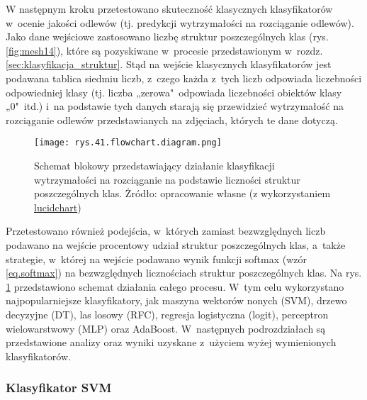 W następnym kroku przetestowano skuteczność klasycznych klasyfikatorów w~ocenie jakości odlewów (tj. predykcji wytrzymałości na rozciąganie odlewów). Jako dane wejściowe zastosowano liczbę struktur poszczególnych klas (rys. \ref{fig:mesh14}), które są pozyskiwane w~procesie przedstawionym w~rozdz. \ref{sec:klasyfikacja_struktur}. Stąd na wejście klasycznych klasyfikatorów jest podawana tablica siedmiu liczb, z~czego każda z~tych liczb odpowiada liczebności odpowiedniej klasy (tj. liczba „zerowa"~odpowiada liczebności obiektów klasy „0"~itd.) i~na podstawie tych danych starają się przewidzieć wytrzymałość na rozciąganie odlewów przedstawianych na zdjęciach, których te dane dotyczą. 
\begin{figure}[!h]
    \centering
    \texttt{[image: rys.41.flowchart.diagram.png]}
    \caption{Schemat blokowy przedstawiający działanie klasyfikacji wytrzymałości na rozciąganie na podstawie liczności struktur poszczególnych klas. Żródło: opracowanie własne (z wykorzystaniem \href{https://www.lucidchart.com}{lucidchart})}
    \label{rys.41.flowchart.diagram.png}
\end{figure}
Przetestowano również podejścia, w~których zamiast bezwzględnych liczb podawano na wejście procentowy udział struktur poszczególnych klas, a~także strategie, w~której na wejście podawano wynik funkcji softmax (wzór \ref{eq.softmax}) na bezwzględnych licznościach struktur poszczególnych klas. Na rys. \ref{rys.41.flowchart.diagram.png} przedstawiono schemat działania całego procesu.
W~tym celu wykorzystano najpopularniejsze klasyfikatory, jak maszyna wektorów nonych (SVM), drzewo decyzyjne (DT), las losowy (RFC), regresja logistyczna (logit), perceptron wielowarstwowy (MLP) oraz AdaBoost. W~następnych podrozdziałach są przedstawione analizy oraz wyniki uzyskane z~użyciem wyżej wymienionych klasyfikatorów.

\subsubsection{Klasyfikator SVM}
\label{structures.with.svm}


